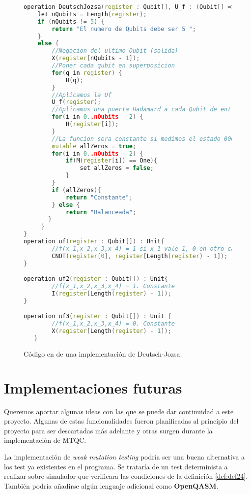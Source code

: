 \begin{figure}[htb]
\begin{lstlisting}[language=c++]
operation DeutschJozsa(register : Qubit[], U_f : (Qubit[] => Unit)) : String {  
    let nQubits = Length(register);
    if (nQubits != 5) {
   		return "El numero de Qubits debe ser 5 ";
    }
    else {
        //Negacion del ultimo Qubit (salida)
        X(register[nQubits - 1]); 
        //Poner cada qubit en superposicion
        for(q in register) {
        	H(q);
        }         
        //Aplicamos la Uf
        U_f(register);
        //Aplicamos una puerta Hadamard a cada Qubit de entrada
        for(i in 0..nQubits - 2) {
        	H(register[i]);
        }        
        //La funcion sera constante si medimos el estado 0000. Balanceada en otro caso.
        mutable allZeros = true;
        for(i in 0..nQubits - 2) {
           	if(M(register[i]) == One){
            	set allZeros = false;
            }
        } 
        if (allZeros){
        	return "Constante";
        } else {
       		return "Balanceada";
       }
     }  
}
operation uf(register : Qubit[]) : Unit{
		//f(x_1,x_2,x_3,x_4) = 1 si x_1 vale 1, 0 en otro caso. Balanceada
		CNOT(register[0], register[Length(register) - 1]);
}

operation uf2(register : Qubit[]) : Unit{
		//f(x_1,x_2,x_3,x_4) = 1. Constante
		I(register[Length(register) - 1]);
}

operation uf3(register : Qubit[]) : Unit { 
		//f(x_1,x_2,x_3,x_4) = 0. Constante  
		X(register[Length(register) - 1]);
   }
\end{lstlisting}
\caption{Código en \qsh de una implementación de Deutsch-Jozsa.}
\end{figure}

\section{Implementaciones futuras}

Queremos aportar algunas ideas con las que se puede dar continuidad a este proyecto. Algunas de estas funcionalidades fueron planificadas al principio del proyecto para ser descartadas más adelante y otras surgen durante la implementación de MTQC.

La implementación de \textit{weak mutation testing} podría ser una buena alternativa a los test ya existentes en el programa. Se trataría de un test determinista a realizar sobre simulador que verificara las condiciones de la definición \ref{def:def24}. También podría añadirse algún lenguaje adicional como \textbf{OpenQASM}.

